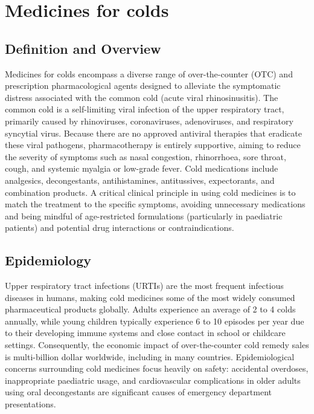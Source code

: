 \chapter{Medicines for colds}

\section*{Definition and Overview}
Medicines for colds encompass a diverse range of over-the-counter (OTC) and prescription pharmacological agents designed to alleviate the symptomatic distress associated with the common cold (acute viral rhinosinusitis). The common cold is a self-limiting viral infection of the upper respiratory tract, primarily caused by rhinoviruses, coronaviruses, adenoviruses, and respiratory syncytial virus. Because there are no approved antiviral therapies that eradicate these viral pathogens, pharmacotherapy is entirely supportive, aiming to reduce the severity of symptoms such as nasal congestion, rhinorrhoea, sore throat, cough, and systemic myalgia or low-grade fever. Cold medications include analgesics, decongestants, antihistamines, antitussives, expectorants, and combination products. A critical clinical principle in using cold medicines is to match the treatment to the specific symptoms, avoiding unnecessary medications and being mindful of age-restricted formulations (particularly in paediatric patients) and potential drug interactions or contraindications.

\section*{Epidemiology}
Upper respiratory tract infections (URTIs) are the most frequent infectious diseases in humans, making cold medicines some of the most widely consumed pharmaceutical products globally. Adults experience an average of 2 to 4 colds annually, while young children typically experience 6 to 10 episodes per year due to their developing immune systems and close contact in school or childcare settings. Consequently, the economic impact of over-the-counter cold remedy sales is multi-billion dollar worldwide, including in many countries. Epidemiological concerns surrounding cold medicines focus heavily on safety: accidental overdoses, inappropriate paediatric usage, and cardiovascular complications in older adults using oral decongestants are significant causes of emergency department presentations.

